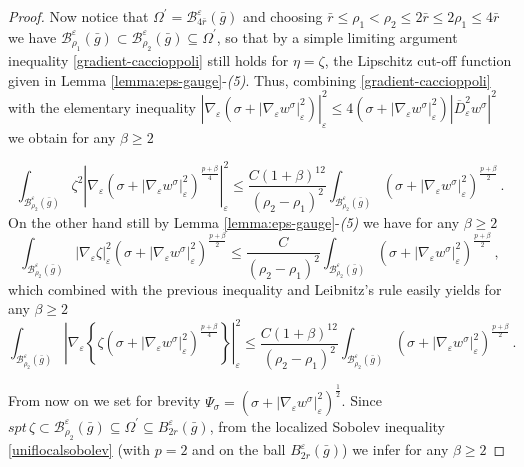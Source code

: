 \documentclass[10pt]{amsart}
\numberwithin{equation}{section}
\theoremstyle{definition}
\begin{document}
\begin{proof}
Now notice that $\Omega^\prime= \mathcal{B}_{ 4\bar{r}}^\varepsilon(\bar{g})$ and choosing $\bar{r}\leq \rho_1<\rho_2 \leq 2 \bar{r}\leq 2 \rho_1  \leq 4\bar{r}$ we have $\mathcal{B}_{ \rho_1}^\varepsilon(\bar{g}) \subset \mathcal{B}_{ \rho_2}^\varepsilon(\bar{g}) \subseteq \Omega^\prime$, so that by a simple limiting argument inequality \eqref{gradient-caccioppoli} still holds for $\eta=\zeta$, the Lipschitz cut-off function given in Lemma \ref{lemma:eps-gauge}-{\it (5)}. Thus, combining \eqref{gradient-caccioppoli} with the elementary inequality $| \nabla_\varepsilon \left( \sigma+  | \nabla_\varepsilon w^\sigma|^2_\varepsilon \right) |^2_\varepsilon \leq 4 \left( \sigma+| \nabla_\varepsilon w^\sigma|^2_\varepsilon  \right)|\overline{D}^2_\varepsilon w^\sigma |^2 $ we obtain for any $\beta \geq 2$

\[
\int_{\mathcal{B}_{ \rho_2}^\varepsilon(\bar{g}) } \zeta^2\left| \nabla_\varepsilon  \left(\sigma+|\nabla_\varepsilon w^\sigma |^2_\varepsilon\right)^{\frac{p+\beta}4} \right|_\varepsilon^2 \leq \frac{C (1+\beta)^{12}}{(\rho_2-\rho_1)^2}   \int_{ \mathcal{B}_{ \rho_2}^\varepsilon(\bar{g})} \left( \sigma+|\nabla_\varepsilon w^\sigma |^2_\varepsilon\right)^{\frac{p+\beta}2} \, .
\]
On the other hand still by Lemma \ref{lemma:eps-gauge}-{\it (5)} we have for any $\beta \geq 2$
\[ \int_{ \mathcal{B}_{ \rho_2}^\varepsilon(\bar{g})} |\nabla_\varepsilon \zeta|_\varepsilon^2 \left( \sigma+|\nabla_\varepsilon w^\sigma |^2_\varepsilon\right)^{\frac{p+\beta}2} \leq \frac{C }{(\rho_2-\rho_1)^2}   \int_{ \mathcal{B}_{ \rho_2}^\varepsilon(\bar{g})} \left( \sigma+|\nabla_\varepsilon w^\sigma |^2_\varepsilon\right)^{\frac{p+\beta}2} \, ,
\]
 which combined with the previous inequality and Leibnitz's rule easily yields for any $\beta \geq 2$
\begin{equation}
\label{gradient-caccioppoli-2}
\int_{\mathcal{B}_{ \rho_2}^\varepsilon(\bar{g}) } \left| \nabla_\varepsilon  \left\{ \zeta \left(\sigma+|\nabla_\varepsilon w^\sigma |^2_\varepsilon\right)^{\frac{p+\beta}4} \right\} \right|_\varepsilon^2 \leq \frac{C (1+\beta)^{12}}{(\rho_2-\rho_1)^2}   \int_{ \mathcal{B}_{ \rho_2}^\varepsilon(\bar{g})} \left( \sigma+|\nabla_\varepsilon w^\sigma |^2_\varepsilon\right)^{\frac{p+\beta}2} \, .
\end{equation}

From now on we set for brevity $\Psi_\sigma=\left( \sigma+|\nabla_\varepsilon w^\sigma |^2_\varepsilon\right)^{\frac12} $. Since $ spt \, \zeta \subset\mathcal{B}_{ \rho_2}^\varepsilon(\bar{g}) \subseteq  \Omega^\prime \subseteq B^\varepsilon_{2r}(\bar{g})$,
from the localized Sobolev inequality \eqref{uniflocalsobolev} (with $p=2$ and on the ball $B^\varepsilon_{2r}(\bar{g})$) we infer for any $\beta \geq 2$


\end{proof}
\end{document}
